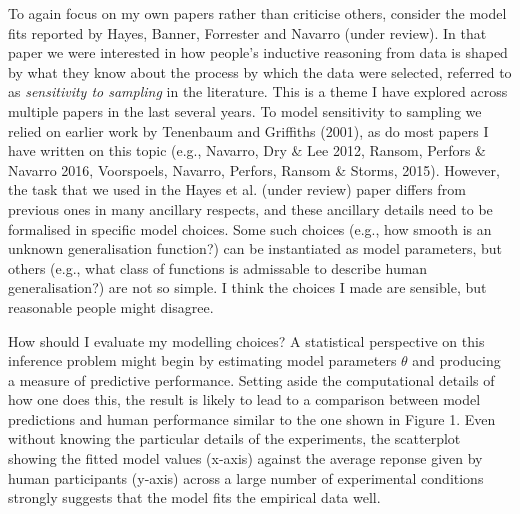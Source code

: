 \documentclass[doc]{apa6}
\theoremstyle{definition}
\theoremstyle{definition}
\theoremstyle{definition}
\theoremstyle{remark}
\begin{document}
To again focus on my own papers rather than criticise others, consider
the model fits reported by Hayes, Banner, Forrester and Navarro (under
review). In that paper we were interested in how people's inductive
reasoning from data is shaped by what they know about the process by
which the data were selected, referred to as \emph{sensitivity to
sampling} in the literature. This is a theme I have explored across
multiple papers in the last several years. To model sensitivity to
sampling we relied on earlier work by Tenenbaum and Griffiths (2001), as
do most papers I have written on this topic (e.g., Navarro, Dry \& Lee
2012, Ransom, Perfors \& Navarro 2016, Voorspoels, Navarro, Perfors,
Ransom \& Storms, 2015). However, the task that we used in the Hayes et
al. (under review) paper differs from previous ones in many ancillary
respects, and these ancillary details need to be formalised in specific
model choices. Some such choices (e.g., how smooth is an unknown
generalisation function?) can be instantiated as model parameters, but
others (e.g., what class of functions is admissable to describe human
generalisation?) are not so simple. I think the choices I made are
sensible, but reasonable people might disagree.

How should I evaluate my modelling choices? A statistical perspective on
this inference problem might begin by estimating model parameters
\(\theta\) and producing a measure of predictive performance. Setting
aside the computational details of how one does this, the result is
likely to lead to a comparison between model predictions and human
performance similar to the one shown in Figure 1. Even without knowing
the particular details of the experiments, the scatterplot showing the
fitted model values (x-axis) against the average reponse given by human
participants (y-axis) across a large number of experimental conditions
strongly suggests that the model fits the empirical data well.
\end{document}
